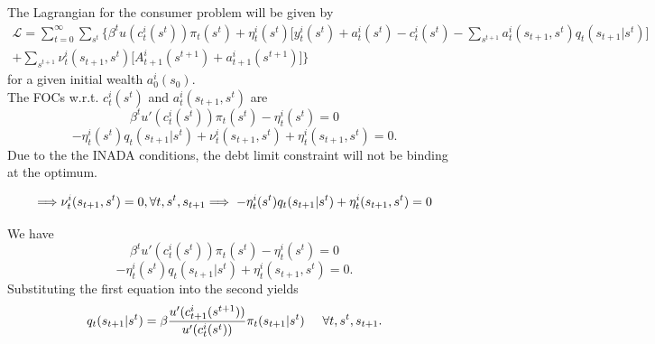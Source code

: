 \documentclass[12pt,a4paper]{article}
\begin{document}
\begin{itemize}
The Lagrangian for the consumer problem will be given by
\begin{multline*}
    \mathcal{L}=\sum_{t=0}^{\infty}\sum_{s^t}\bigg\{
    \beta^t u(c_{t}^{i}(s^t))\pi_t(s^t)+\eta_{t}^{i}(s^t)\bigg[y_{t}^{i}(s^t)+a_{t}^{i}(s^t)-c_{t}^{i}(s^t)-\sum_{s^{t+1}}a_{t}^{i}(s_{t+1},s^t)q_t(s_{t+1}|s^{t})\bigg]\\
    +\sum_{s^{t+1}}\nu_{t}^{i}(s_{t+1},s^t)\bigg[A_{t+1}^{i}(s^{t+1})+a_{t+1}^{i}(s^{t+1})\bigg]\bigg\}
\end{multline*}
for a given initial wealth $a_0^{i}(s_0)$.\\

The FOCs w.r.t. $c_{t}^{i}(s^t)$ and $a_{t}^{i}(s_{t+1},s^t)$ are
\begin{equation*}
    \beta^t u'(c_{t}^{i}(s^t))\pi_t(s^t)-\eta_{t}^{i}(s^t)=0
\end{equation*}
\begin{equation*}
    -\eta_{t}^{i}(s^t)q_t(s_{t+1}|s^{t})+\nu_{t}^{i}(s_{t+1},s^t)+\eta_{t}^{i}(s_{t+1},s^t)=0.
\end{equation*}
Due to the the INADA conditions, the debt limit constraint will not be binding at the optimum.

\begin{align*}
\Longrightarrow \nu_{t}^{i}(s_{t+1},s^t)=0, \forall t, s^t, s_{t+1}\Longrightarrow\hspace{1mm} -\eta_{t}^{i}(s^t)q_t(s_{t+1}|s^{t})+\eta_{t}^{i}(s_{t+1},s^t)=0
\end{align*}

We have
\begin{equation*}
        \beta^t u'(c_{t}^{i}(s^t))\pi_t(s^t)-\eta_{t}^{i}(s^t)=0
\end{equation*}
\begin{equation*}
    -\eta_{t}^{i}(s^t)q_t(s_{t+1}|s^{t})+\eta_{t}^{i}(s_{t+1},s^t)=0.
\end{equation*}
Substituting the first equation into the second yields
\begin{equation}
    q_t(s_{t+1}|s^{t})=\beta\frac{u'(c_{t+1}^{i}(s^{t+1}))}{u'(c_{t}^{i}(s^t))}\pi_t(s_{t+1}|s^{t}) \hspace{5mm} \forall t, s^t, s_{t+1}.
\end{equation}


\end{itemize}
\end{document}
